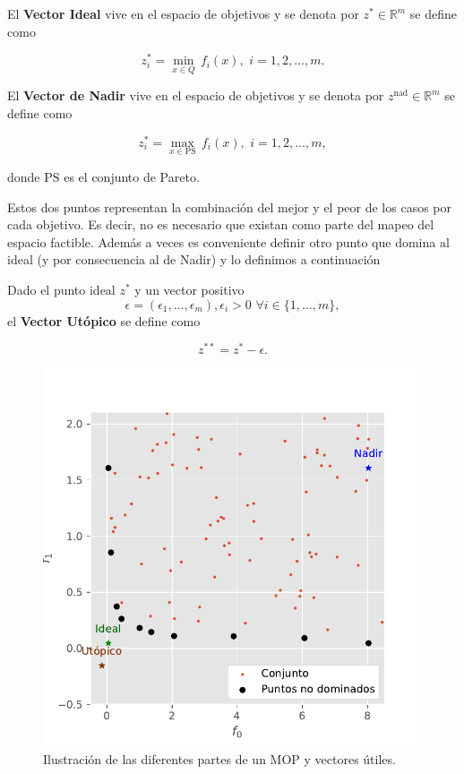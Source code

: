 \begin{definition} \label{def:Ideal}
    El \textbf{Vector Ideal} vive en el espacio de objetivos y se denota por $z^*\in \mathbb{R}^m$ se define como 
    
    $$z^*_i=\min_{x\in Q}\, f_i(x), \,\, i=1,2,\ldots,m .$$
\end{definition}

\begin{definition} \label{def:Nadir}
    El \textbf{Vector de Nadir} vive en el espacio de objetivos y se denota por $z^{\text{nad}}\in \mathbb{R}^m$ se define como 
    
    $$z^*_i=\max_{x\in \text{PS}}\, f_i(x), \,\, i=1,2,\ldots,m ,$$

    donde $\text{PS}$ es el conjunto de Pareto.
\end{definition}

Estos dos puntos representan la combinación del mejor y el peor de los casos por cada objetivo. Es decir, no es necesario que existan como parte del mapeo del espacio factible. Además a veces es conveniente definir  otro punto que domina al ideal (y por consecuencia al de Nadir) y lo definimos a continuación

\begin{definition} \label{def:utopico}
    Dado el punto ideal $z^*$ y un vector positivo $$\epsilon=(\epsilon_1,\ldots,\epsilon_m) , \epsilon_i>0 \,\, \forall i \in \{1,\ldots,m\},$$
    el \textbf{Vector Utópico} se define como 

    $$ z^{**}=z^*-\epsilon .$$
\end{definition}

\begin{figure}[H]
    \centering
    \includegraphics[scale=0.7]{Figuras/nadir_utopico_ideal.pdf}
    \caption{Ilustración de las diferentes partes de un MOP y vectores útiles.}
    \label{fig:vectores_referencia}
\end{figure}

